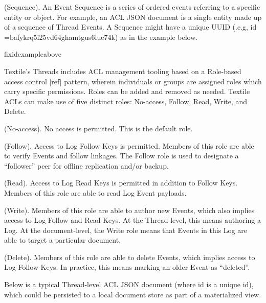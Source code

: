 \documentclass{comjnl}
\begin{document}
\begin{definition}
(Sequence). An Event Sequence is a series of ordered events referring to a specific entity or object. For example, an ACL JSON document is a single entity made up of a sequence of Thread Events. A Sequence might have a unique UUID (.e.g, id =bafykrq5i25vd64ghamtgus6lue74k) as in the example below.
\end{definition}

fixidexampleabove

Textile’s Threads includes ACL management tooling based on a Role-based access control [ref] pattern, wherein individuals or groups are assigned roles which carry specific permissions. Roles can be added and removed as needed. Textile ACLs can make use of five distinct roles: No-access, Follow, Read, Write, and Delete.

\begin{definition}
(No-access). No access is permitted. This is the default role.
\end{definition}

\begin{definition}
(Follow). Access to Log Follow Keys is permitted. Members of this role are able to verify Events and follow linkages. The Follow role is used to designate a “follower” peer for offline replication and/or backup.
\end{definition}

\begin{definition}
(Read). Access to Log Read Keys is permitted in addition to Follow Keys. Members of this role are able to read Log Event payloads.
\end{definition}

\begin{definition}
(Write). Members of this role are able to author new Events, which also implies access to Log Follow and Read Keys. At the Thread-level, this means authoring a Log. At the document-level, the Write role means that Events in this Log are able to target a particular document.
\end{definition}

\begin{definition}
(Delete). Members of this role are able to delete Events, which implies access to Log Follow Keys. In practice, this means marking an older Event as “deleted”.
\end{definition}

Below is a typical Thread-level ACL JSON document (where id is a unique id), which could be persisted to a local document store as part of a materialized view.
\end{document}

